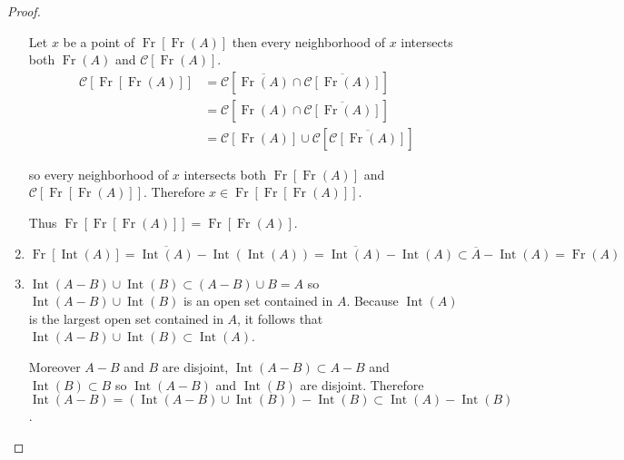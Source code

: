 \begin{proof}
\begin{enumerate}[label={(\alph*)},itemsep=0pt,leftmargin=*]
		      Let \(x\) be a point of \( \operatorname{Fr}\left[\operatorname{Fr}(A)\right] \) then every neighborhood of \(x\) intersects both \( \operatorname{Fr}(A) \) and \( \mathscr{C}\left[\operatorname{Fr}(A)\right] \).
		      \begingroup
		      \allowdisplaybreaks%
		      \begin{align*}
			      \mathscr{C}\left[ \operatorname{Fr}\left[\operatorname{Fr}(A)\right] \right] & = \mathscr{C}\left[ \overline{\operatorname{Fr}(A)} \cap \overline{\mathscr{C}\left[ \operatorname{Fr}(A) \right]} \right]          \\
			                                                                                   & = \mathscr{C}\left[ \operatorname{Fr}(A) \cap \overline{\mathscr{C}\left[\operatorname{Fr}(A)\right]} \right]                       \\
			                                                                                   & = \mathscr{C}\left[\operatorname{Fr}(A)\right] \cup \mathscr{C}\left[\overline{\mathscr{C}\left[\operatorname{Fr}(A)\right]}\right]
		      \end{align*}
		      \endgroup

		      so every neighborhood of \(x\) intersects both \( \operatorname{Fr}\left[\operatorname{Fr}(A)\right] \) and \( \mathscr{C}\left[\operatorname{Fr}\left[\operatorname{Fr}(A)\right]\right] \). Therefore \( x \in \operatorname{Fr}\left[\operatorname{Fr}\left[\operatorname{Fr}(A)\right]\right] \).

		      Thus \( \operatorname{Fr}\left[\operatorname{Fr}\left[\operatorname{Fr}(A)\right]\right] = \operatorname{Fr}\left[\operatorname{Fr}(A)\right] \).
		\item \( \operatorname{Fr}\left[ \operatorname{Int}(A) \right] = \overline{\operatorname{Int}(A)} - \operatorname{Int}(\operatorname{Int}(A)) = \overline{\operatorname{Int}(A)} - \operatorname{Int}(A) \subset \overline{A} - \operatorname{Int}(A) = \operatorname{Fr}(A) \)
		\item \( \operatorname{Int}(A - B) \cup \operatorname{Int}(B) \subset (A - B) \cup B = A \) so \( \operatorname{Int}(A - B) \cup \operatorname{Int}(B) \) is an open set contained in \( A \). Because \( \operatorname{Int}(A) \) is the largest open set contained in \(A\), it follows that \( \operatorname{Int}(A - B) \cup \operatorname{Int}(B) \subset \operatorname{Int}(A) \).


		      Moreover \( A - B \) and \( B \) are disjoint, \( \operatorname{Int}(A - B) \subset A - B \) and \( \operatorname{Int}(B) \subset B \) so \( \operatorname{Int}(A - B) \) and \( \operatorname{Int}(B) \) are disjoint. Therefore \( \operatorname{Int}(A - B) = (\operatorname{Int}(A - B) \cup \operatorname{Int}(B)) - \operatorname{Int}(B) \subset \operatorname{Int}(A) - \operatorname{Int}(B) \).
	\end{enumerate}
\end{proof}

